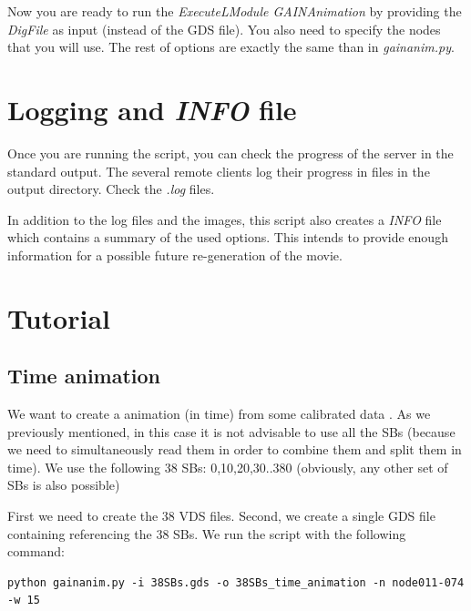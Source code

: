 \documentclass[a4paper,11pt]{article}
\begin{document}
Now you are ready to run the \textit{ExecuteLModule GAINAnimation} by providing the \textit{DigFile} as input (instead of the GDS file). You also need to specify the nodes that you will use. The rest of options are exactly the same than in \textit{gainanim.py}.

\section { Logging and \textit{INFO} file }

Once you are running the script, you can check the progress of the server in the standard output. The several remote clients log their progress in files in the output directory. Check the \textit{.log} files.

In addition to the log files and the images, this script also creates a \textit{INFO} file which contains a summary of the used options. This intends to provide enough information for a possible future re-generation of the movie.

\section { Tutorial}

\subsection {Time animation}

We want to create a animation (in time) from some calibrated data . As we previously mentioned, in this case it is not advisable to use all the SBs (because we need to simultaneously read them in order to combine them and split them in time). We use the following 38 SBs: 0,10,20,30..380 (obviously, any other set of SBs is also possible)

First we need to create the 38 VDS files. Second, we create a single GDS file containing referencing the 38 SBs. We run the script with the following command:

\begin{small}
\begin{verbatim}
python gainanim.py -i 38SBs.gds -o 38SBs_time_animation -n node011-074 -w 15
\end{verbatim}
\end{small}
\end{document}
